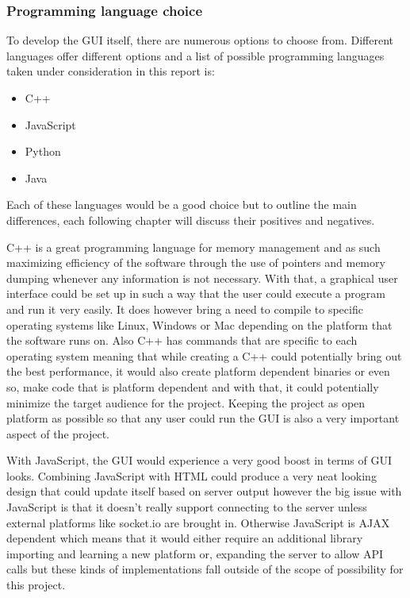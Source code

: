       \subsubsection{Programming language choice}
        To develop the GUI itself, there are numerous options to choose from. Different languages offer different options and a list of possible programming languages taken under consideration in this report is:
        
          \begin{itemize}
            \item C++
            \item JavaScript
            \item Python
            \item Java
          \end{itemize}

        Each of these languages would be a good choice but to outline the main differences, each following chapter will discuss their positives and negatives.

        C++ is a great programming language for memory management and as such maximizing efficiency of the software through the use of pointers and memory dumping whenever any information is not necessary. With that, a graphical user interface could be set up in such a way that the user could execute a program and run it very easily. It does however bring a need to compile to specific operating systems like Linux, Windows or Mac depending on the platform that the software runs on\cite{cplus}. Also C++ has commands that are specific to each operating system meaning that while creating a C++ could potentially bring out the best performance, it would also create platform dependent binaries or even so, make code that is platform dependent and with that, it could potentially minimize the target audience for the project. Keeping the project as open platform as possible so that any user could run the GUI is also a very important aspect of the project.

        With JavaScript, the GUI would experience a very good boost in terms of GUI looks. Combining JavaScript with HTML could produce a very neat looking design that could update itself based on server output however the big issue with JavaScript is that it doesn't really support connecting to the server unless external platforms like socket.io\cite{socketio} are brought in. Otherwise JavaScript is AJAX dependent which means that it would either require an additional library importing and learning a new platform or, expanding the server to allow API calls but these kinds of implementations fall outside of the scope of possibility for this project.


